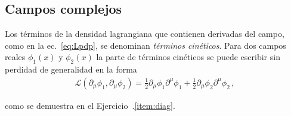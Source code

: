 \begin{frame}

\section{Campos complejos}
Los términos de la densidad lagrangiana que contienen derivadas del campo, como en la ec.~\eqref{eq:Lpdp}, se denominan \emph{términos cinéticos}. Para dos campos reales $\phi_1(x)$ y $\phi_2(x)$ la parte de términos cinéticos se puede escribir sin perdidad de generalidad en la forma
\begin{align}
  \label{eq:kincmplx}
  \mathcal{L}(\partial_{\mu} \phi_1,\partial_{\mu} \phi_2)=  \frac{1}{2}\partial_{\mu}\phi_1 \partial^{\mu}\phi_1+\frac{1}{2}\partial_{\mu}\phi_2 \partial^{\mu}\phi_2\,,
\end{align}
\end{frame}
como se demuestra en el Ejercicio~\thechapter.\ref{item:diag}.

